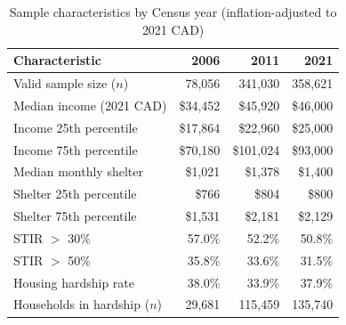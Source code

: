 \begin{table}[htbp]
\centering
\caption{Sample characteristics by Census year (inflation-adjusted to 2021 CAD)}
\label{tab:sample}
\small
\begin{tabular}{lrrr}
\toprule
Characteristic & 2006 & 2011 & 2021 \\
\midrule
Valid sample size ($n$) & 78,056 & 341,030 & 358,621 \\
Median income (2021 CAD) & \$34,452 & \$45,920 & \$46,000 \\
Income 25th percentile & \$17,864 & \$22,960 & \$25,000 \\
Income 75th percentile & \$70,180 & \$101,024 & \$93,000 \\
Median monthly shelter & \$1,021 & \$1,378 & \$1,400 \\
Shelter 25th percentile & \$766 & \$804 & \$800 \\
Shelter 75th percentile & \$1,531 & \$2,181 & \$2,129 \\
STIR $>$ 30\% & 57.0\% & 52.2\% & 50.8\% \\
STIR $>$ 50\% & 35.8\% & 33.6\% & 31.5\% \\
Housing hardship rate & 38.0\% & 33.9\% & 37.9\% \\
Households in hardship ($n$) & 29,681 & 115,459 & 135,740 \\
\bottomrule
\end{tabular}
\par{}
\end{table}
